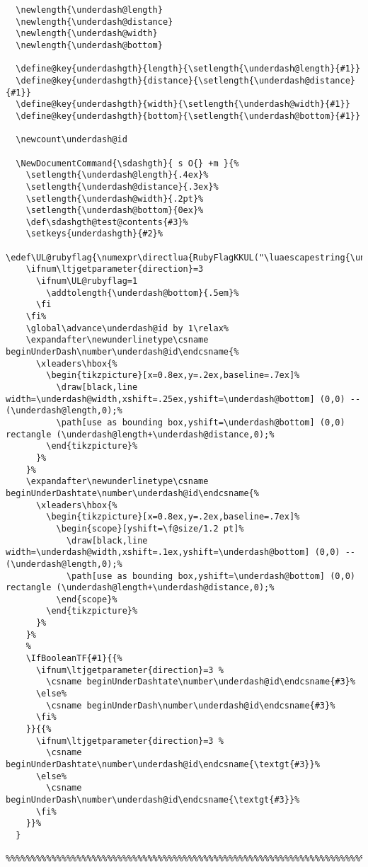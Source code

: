 \documentclass[luatex,fontsize=8pt,paper=b5,twoside]{jlreq}%
\begin{document}
\begin{lstlisting}
  \newlength{\underdash@length}
  \newlength{\underdash@distance}
  \newlength{\underdash@width}
  \newlength{\underdash@bottom}

  \define@key{underdashgth}{length}{\setlength{\underdash@length}{#1}}
  \define@key{underdashgth}{distance}{\setlength{\underdash@distance}{#1}}
  \define@key{underdashgth}{width}{\setlength{\underdash@width}{#1}}
  \define@key{underdashgth}{bottom}{\setlength{\underdash@bottom}{#1}}

  \newcount\underdash@id 

  \NewDocumentCommand{\sdashgth}{ s O{} +m }{%
    \setlength{\underdash@length}{.4ex}%
    \setlength{\underdash@distance}{.3ex}%
    \setlength{\underdash@width}{.2pt}%
    \setlength{\underdash@bottom}{0ex}%
    \def\sdashgth@test@contents{#3}%
    \setkeys{underdashgth}{#2}%
    \edef\UL@rubyflag{\numexpr\directlua{RubyFlagKKUL("\luaescapestring{\unexpanded\expandafter{\sdashgth@test@contents}}")}\relax}%
    \ifnum\ltjgetparameter{direction}=3
      \ifnum\UL@rubyflag=1
        \addtolength{\underdash@bottom}{.5em}%
      \fi
    \fi%
    \global\advance\underdash@id by 1\relax%
    \expandafter\newunderlinetype\csname beginUnderDash\number\underdash@id\endcsname{%
      \xleaders\hbox{%
        \begin{tikzpicture}[x=0.8ex,y=.2ex,baseline=.7ex]%
          \draw[black,line width=\underdash@width,xshift=.25ex,yshift=\underdash@bottom] (0,0) -- (\underdash@length,0);%
          \path[use as bounding box,yshift=\underdash@bottom] (0,0) rectangle (\underdash@length+\underdash@distance,0);%
        \end{tikzpicture}%
      }%
    }%
    \expandafter\newunderlinetype\csname beginUnderDashtate\number\underdash@id\endcsname{%
      \xleaders\hbox{%
        \begin{tikzpicture}[x=0.8ex,y=.2ex,baseline=.7ex]%
          \begin{scope}[yshift=\f@size/1.2 pt]%
            \draw[black,line width=\underdash@width,xshift=.1ex,yshift=\underdash@bottom] (0,0) -- (\underdash@length,0);%
            \path[use as bounding box,yshift=\underdash@bottom] (0,0) rectangle (\underdash@length+\underdash@distance,0);%
          \end{scope}%
        \end{tikzpicture}%
      }%
    }%
    %
    \IfBooleanTF{#1}{{% 
      \ifnum\ltjgetparameter{direction}=3 %
        \csname beginUnderDashtate\number\underdash@id\endcsname{#3}%
      \else%
        \csname beginUnderDash\number\underdash@id\endcsname{#3}%
      \fi%
    }}{{% 
      \ifnum\ltjgetparameter{direction}=3 %
        \csname beginUnderDashtate\number\underdash@id\endcsname{\textgt{#3}}%
      \else%
        \csname beginUnderDash\number\underdash@id\endcsname{\textgt{#3}}%
      \fi%
    }}%
  }
  %%%%%%%%%%%%%%%%%%%%%%%%%%%%%%%%%%%%%%%%%%%%%%%%%%%%%%%%%%%%%%%%%%%%%%%%%%%%%%%%%%%%%%%%%



\end{lstlisting}
\end{document}
